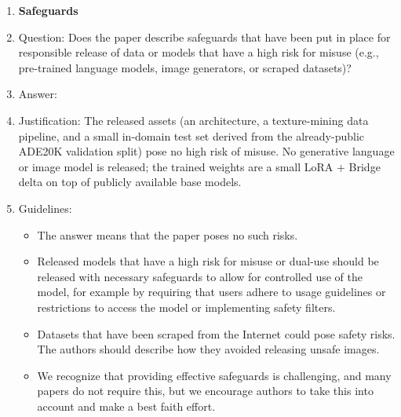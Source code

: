 \begin{enumerate}
\item {\bf Safeguards}
    \item[] Question: Does the paper describe safeguards that have been put in place for responsible release of data or models that have a high risk for misuse (e.g., pre-trained language models, image generators, or scraped datasets)?
    \item[] Answer: \answerNA{}
    \item[] Justification: The released assets (an architecture, a texture-mining data pipeline, and a small in-domain test set derived from the already-public ADE20K validation split) pose no high risk of misuse. No generative language or image model is released; the trained weights are a small LoRA + Bridge delta on top of publicly available base models.
    \item[] Guidelines:
    \begin{itemize}
        \item The answer \answerNA{} means that the paper poses no such risks.
        \item Released models that have a high risk for misuse or dual-use should be released with necessary safeguards to allow for controlled use of the model, for example by requiring that users adhere to usage guidelines or restrictions to access the model or implementing safety filters.
        \item Datasets that have been scraped from the Internet could pose safety risks. The authors should describe how they avoided releasing unsafe images.
        \item We recognize that providing effective safeguards is challenging, and many papers do not require this, but we encourage authors to take this into account and make a best faith effort.
    \end{itemize}


\end{enumerate}

